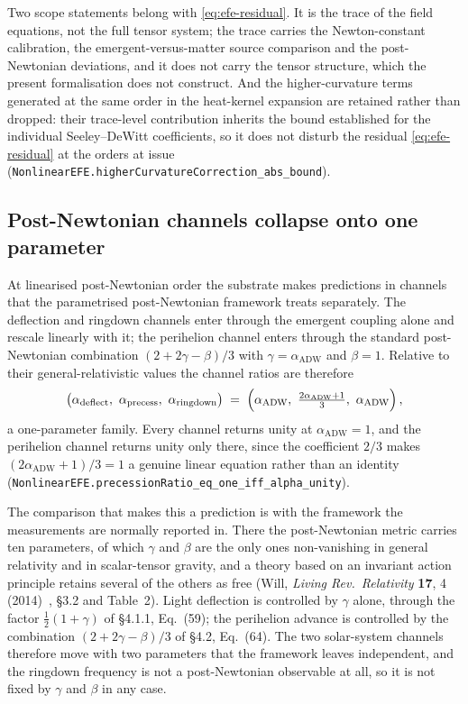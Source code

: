 \documentclass[aps,prd,nofootinbib,superscriptaddress,12pt]{revtex4-2}
\DeclareRobustCommand{\lb}{\discretionary{}{}{}}
\begin{document}
Two scope statements belong with \eqref{eq:efe-residual}. It is the trace of the
field equations, not the full tensor system; the trace carries the
Newton-constant calibration, the emergent-versus-matter source comparison and
the post-Newtonian deviations, and it does not carry the tensor structure, which
the present formalisation does not construct. And the higher-curvature terms
generated at the same order in the heat-kernel expansion are retained rather
than dropped: their trace-level contribution inherits the bound established for
the individual Seeley--DeWitt coefficients, so it does not disturb the residual
\eqref{eq:efe-residual} at the orders at issue
(\texttt{Nonlinear\lb{}EFE.\lb{}higher\lb{}Curvature\lb{}Correction\_\lb{}abs\_\lb{}bound}).

\subsection{Post-Newtonian channels collapse onto one parameter}
\label{sec:efe-ppn}

At linearised post-Newtonian order the substrate makes predictions in channels
that the parametrised post-Newtonian framework treats separately. The
deflection and ringdown channels enter through the emergent coupling alone and
rescale linearly with it; the perihelion channel enters through the standard
post-Newtonian combination $(2 + 2\gamma - \beta)/3$ with $\gamma =
\alpha_{\mathrm{ADW}}$ and $\beta = 1$. Relative to their general-relativistic
values the channel ratios are therefore
\begin{equation}
\label{eq:ppn-triple}
\bigl(\alpha_{\mathrm{deflect}},\ \alpha_{\mathrm{precess}},\
      \alpha_{\mathrm{ringdown}}\bigr)
\;=\;
\Bigl(\alpha_{\mathrm{ADW}},\ \tfrac{2\alpha_{\mathrm{ADW}}+1}{3},\
      \alpha_{\mathrm{ADW}}\Bigr)\,,
\end{equation}
a one-parameter family. Every channel returns unity at
$\alpha_{\mathrm{ADW}} = 1$, and the perihelion channel returns unity only
there, since the coefficient $2/3$ makes
$(2\alpha_{\mathrm{ADW}}+1)/3 = 1$ a genuine linear equation rather than an
identity (\texttt{Nonlinear\lb{}EFE.\lb{}precession\lb{}Ratio\_\lb{}eq\_\lb{}one\_\lb{}iff\_\lb{}alpha\_\lb{}unity}).

The comparison that makes this a prediction is with the framework the
measurements are normally reported in. There the post-Newtonian metric carries
ten parameters, of which $\gamma$ and $\beta$ are the only ones non-vanishing in
general relativity and in scalar-tensor gravity, and a theory based on an
invariant action principle retains several of the others as free
(Will, \emph{Living Rev.\ Relativity} \textbf{17}, 4 (2014)~\cite{Will2014},
\S3.2 and Table~2). Light deflection is controlled by $\gamma$ alone, through
the factor $\tfrac12(1+\gamma)$ of \S4.1.1, Eq.~(59); the perihelion advance is
controlled by the combination $(2+2\gamma-\beta)/3$ of \S4.2, Eq.~(64). The two
solar-system channels therefore move with two parameters that the framework
leaves independent, and the ringdown frequency is not a post-Newtonian
observable at all, so it is not fixed by $\gamma$ and $\beta$ in any case.
\end{document}
